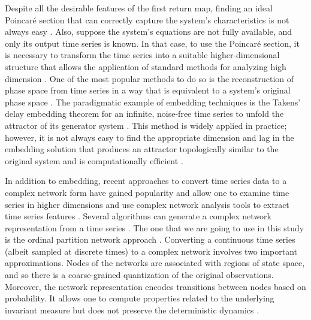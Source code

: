 \documentclass[%
 aip,
 amsmath,amssymb,
 reprint,%
]{revtex4-1}
\begin{document}
\begin{figure}[htbp]
    \label{LorenzPoincareSection}
\end{figure}

Despite all the desirable features of the first return map, finding an ideal Poincar\'e section that can correctly capture the system's characteristics is not always easy \cite{r44}. Also, suppose the system's equations are not fully available, and only its output time series is known. In that case, to use the Poincar\'e section, it is necessary to transform the time series into a suitable higher-dimensional structure that allows the application of standard methods for analyzing high dimension \cite{r22}.
One of the most popular methods to do so is the reconstruction of phase space from time series in a way that is equivalent to a system's original phase space \cite{r35}. The paradigmatic example of embedding techniques is the Takens' delay embedding theorem for an infinite, noise-free time series to unfold the attractor of its generator system \cite{r36}. This method is widely applied in practice; however, it is not always easy to find the appropriate dimension and lag in the embedding solution that produces an attractor topologically similar to the original system and is computationally efficient \cite{r43}.

In addition to embedding, recent approaches to convert time series data to a complex network form have gained popularity and allow one to examine time series in higher dimensions and use complex network analysis tools to extract time series features \cite{r29,r30,r41}. Several algorithms can generate a complex network representation from a time series \cite{r12,r13,r14,r15}. The one that we are going to use in this study is the ordinal partition network approach \cite{r16}. Converting a continuous time series (albeit sampled at discrete times) to a complex network involves two important approximations. Nodes of the networks are associated with regions of state space, and so there is a coarse-grained quantization of the original observations. Moreover, the network representation encodes transitions between nodes based on probability. It allows one to compute properties related to the underlying invariant measure but does not preserve the deterministic dynamics \cite{r23}.
\end{document}
